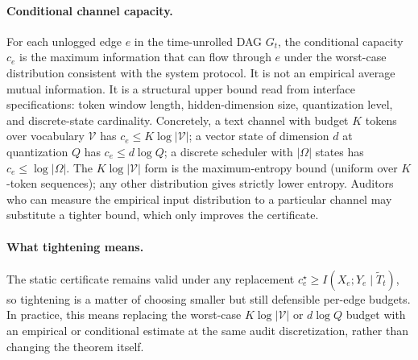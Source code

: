 \documentclass{article}
\begin{document}
\paragraph{Conditional channel capacity.}
For each unlogged edge $e$ in the time-unrolled DAG $G_t$, the conditional capacity $c_e$ is the maximum information that can flow through $e$ under the worst-case distribution consistent with the system protocol. It is not an empirical average mutual information. It is a structural upper bound read from interface specifications: token window length, hidden-dimension size, quantization level, and discrete-state cardinality. Concretely, a text channel with budget $K$ tokens over vocabulary $\mathcal{V}$ has $c_e \leq K \log |\mathcal{V}|$; a vector state of dimension $d$ at quantization $Q$ has $c_e \leq d \log Q$; a discrete scheduler with $|\Omega|$ states has $c_e \leq \log |\Omega|$. The $K \log |\mathcal{V}|$ form is the maximum-entropy bound (uniform over $K$-token sequences); any other distribution gives strictly lower entropy. Auditors who can measure the empirical input distribution to a particular channel may substitute a tighter bound, which only improves the certificate.

\paragraph{What tightening means.}
The static certificate remains valid under any replacement $c_e^\star \geq I(X_e; Y_e \mid \tilde T_t)$, so tightening is a matter of choosing smaller but still defensible per-edge budgets. In practice, this means replacing the worst-case $K \log |\mathcal{V}|$ or $d \log Q$ budget with an empirical or conditional estimate at the same audit discretization, rather than changing the theorem itself.
\end{document}
